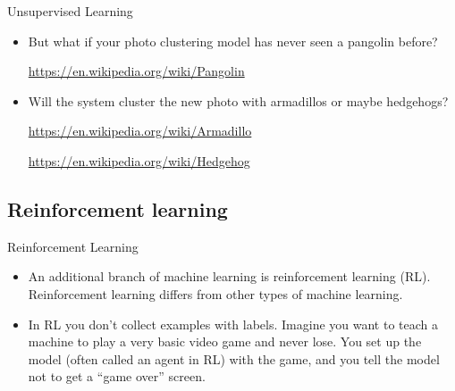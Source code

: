 \documentclass{beamer}
\begin{document}

\begin{frame}{Unsupervised Learning}

\begin{itemize}
\item But what if your photo clustering model has never seen a pangolin before? 

\url{https://en.wikipedia.org/wiki/Pangolin}

\item Will the system cluster the new photo with armadillos or maybe hedgehogs? 

\url{https://en.wikipedia.org/wiki/Armadillo}

\url{https://en.wikipedia.org/wiki/Hedgehog}
\end{itemize}

\end{frame}


\subsection{Reinforcement learning}

\begin{frame}{Reinforcement Learning}

\begin{itemize}
\item An additional branch of machine learning is reinforcement learning (RL). Reinforcement learning differs from other types of machine learning. 

\item In RL you don't collect examples with labels. Imagine you want to teach a machine to play a very basic video game and never lose. You set up the model (often called an agent in RL) with the game, and you tell the model not to get a ``game over'' screen. 
\end{itemize}
\end{frame}
\end{document}
